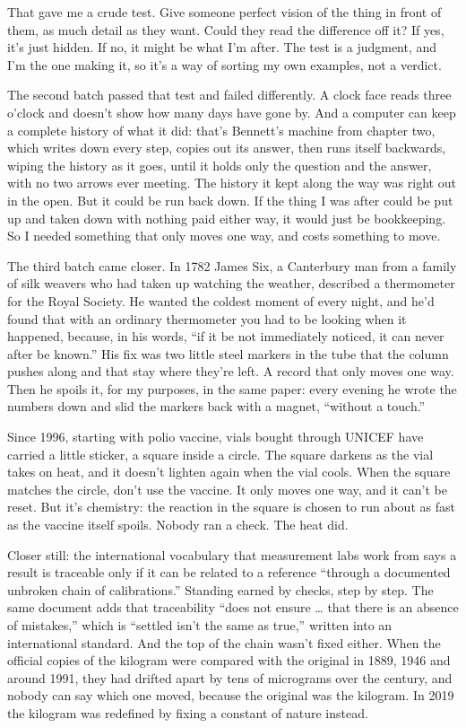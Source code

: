 \documentclass[11pt,twoside]{article}
\theoremstyle{thielethm}
\theoremstyle{thieledef}
\theoremstyle{thieledef}
\theoremstyle{thieledef}
\theoremstyle{thielethm}
\theoremstyle{thieleobs}
\theoremstyle{thielethm}
\begin{document}
That gave me a crude test. Give someone perfect vision of the thing in front of them, as much detail as they want. Could they read the difference off it? If yes, it's just hidden. If no, it might be what I'm after. The test is a judgment, and I'm the one making it, so it's a way of sorting my own examples, not a verdict.

The second batch passed that test and failed differently. A clock face reads three o'clock and doesn't show how many days have gone by. And a computer can keep a complete history of what it did: that's Bennett's machine from chapter two, which writes down every step, copies out its answer, then runs itself backwards, wiping the history as it goes, until it holds only the question and the answer, with no two arrows ever meeting. The history it kept along the way was right out in the open. But it could be run back down. If the thing I was after could be put up and taken down with nothing paid either way, it would just be bookkeeping. So I needed something that only moves one way, and costs something to move.

The third batch came closer. In 1782 James Six, a Canterbury man from a family of silk weavers who had taken up watching the weather, described a thermometer for the Royal Society. He wanted the coldest moment of every night, and he'd found that with an ordinary thermometer you had to be looking when it happened, because, in his words, ``if it be not immediately noticed, it can never after be known.'' His fix was two little steel markers in the tube that the column pushes along and that stay where they're left. A record that only moves one way. Then he spoils it, for my purposes, in the same paper: every evening he wrote the numbers down and slid the markers back with a magnet, ``without a touch.''

Since 1996, starting with polio vaccine, vials bought through UNICEF have carried a little sticker, a square inside a circle. The square darkens as the vial takes on heat, and it doesn't lighten again when the vial cools. When the square matches the circle, don't use the vaccine. It only moves one way, and it can't be reset. But it's chemistry: the reaction in the square is chosen to run about as fast as the vaccine itself spoils. Nobody ran a check. The heat did.

Closer still: the international vocabulary that measurement labs work from says a result is traceable only if it can be related to a reference ``through a documented unbroken chain of calibrations.'' Standing earned by checks, step by step. The same document adds that traceability ``does not ensure \ldots{} that there is an absence of mistakes,'' which is ``settled isn't the same as true,'' written into an international standard. And the top of the chain wasn't fixed either. When the official copies of the kilogram were compared with the original in 1889, 1946 and around 1991, they had drifted apart by tens of micrograms over the century, and nobody can say which one moved, because the original was the kilogram. In 2019 the kilogram was redefined by fixing a constant of nature instead.
\end{document}

